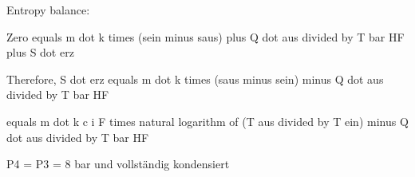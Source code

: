 Entropy balance:

Zero equals m dot k times (sein minus saus) plus Q dot aus divided by T bar HF plus S dot erz

Therefore, S dot erz equals m dot k times (saus minus sein) minus Q dot aus divided by T bar HF

equals m dot k c i F times natural logarithm of (T aus divided by T ein) minus Q dot aus divided by T bar HF

P4 = P3 = 8 bar
und vollständig kondensiert